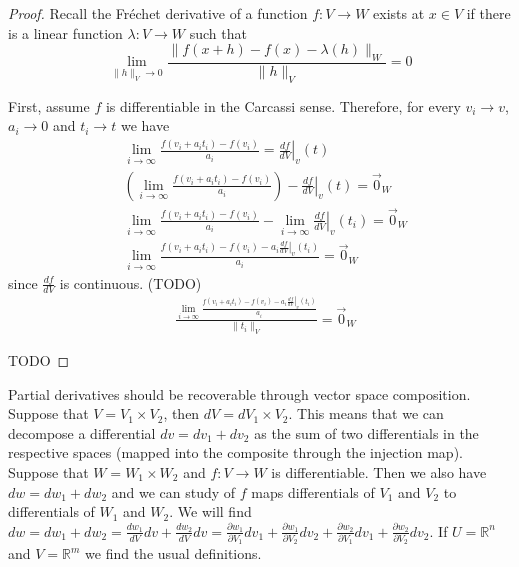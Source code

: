 \documentclass[11pt,letterpaper,fleqn]{memoir}
\begin{document}
\begin{proof}
	Recall the Fr\'{e}chet derivative of a function $f: V \to W$ exists at $x \in V$ if there is a linear function $\lambda: V \to W$ such that
	\begin{equation}
	\lim_{\lVert h \rVert_{V} \to 0} \frac{\lVert f(x + h) - f(x) - \lambda(h) \rVert_{W}}{\lVert h \rVert_{V}} = 0 
	\end{equation}
	
	First, assume $f$ is differentiable in the Carcassi sense. Therefore, for every $v_i \to v$, $a_i \to 0$ and $t_i \to t$ we have
	\begin{equation}
		\begin{aligned}
	&\lim_{i \to \infty} \frac{f(v_{i} + a_{i}t_{i}) - f(v_{i})}{a_{i}} = \left.\frac{df}{dV}\right|_{v}(t) \\
	&\left( \lim_{i \to \infty} \frac{f(v_{i} + a_{i}t_{i}) - f(v_{i})}{a_{i}} \right) - \left.\frac{df}{dV}\right|_{v}(t) = \vec{0}_{W} \\
	&\lim_{i \to \infty} \frac{f(v_{i} + a_{i}t_{i}) - f(v_{i})}{a_{i}} - \lim_{i \to \infty}  \left.\frac{df}{dV}\right|_{v}(t_i) = \vec{0}_{W} \\
	&\lim_{i \to \infty} \frac{f(v_{i} + a_{i}t_{i}) - f(v_{i}) - a_{i}\left.\frac{df}{dV}\right|_{v}(t_i)}{a_{i}} = \vec{0}_{W}
		\end{aligned}
	\end{equation}
	since $\frac{df}{dV}$ is continuous. (TODO) 
	\begin{equation}
		\begin{aligned}
	&\frac{\lim_{i \to \infty} \frac{f(v_{i} + a_{i}t_{i}) - f(v_{i}) - a_{i}\left.\frac{df}{dV}\right|_{v}(t_i)}{a_{i}}}{\lVert t_i \rVert_{V}} = \vec{0}_{W}
		\end{aligned}
	\end{equation}

	TODO	
\end{proof}

\begin{remark}
	Partial derivatives should be recoverable through vector space composition. Suppose that $V = V_1 \times V_2$, then $dV = dV_1 \times V_2$. This means that we can decompose a differential $dv= dv_1 + dv_2$ as the sum of two differentials in the respective spaces (mapped into the composite through the injection map). Suppose that $W = W_1 \times W_2$ and $f : V \to W$ is differentiable. Then we also have $dw= dw_1 + dw_2$ and we can study of $f$ maps differentials of $V_1$ and $V_2$ to differentials of $W_1$ and $W_2$. We will find $dw = dw_1 + dw_2 = \frac{dw_1}{dV} dv + \frac{dw_2}{dV} dv = \frac{\partial w_1}{\partial V_1} dv_1 + \frac{\partial w_1}{\partial V_2} dv_2 + \frac{\partial w_2}{\partial V_1} dv_1 + \frac{\partial w_2}{\partial V_2} dv_2$. If $U = \mathbb{R}^n$ and $V = \mathbb{R}^m$ we find the usual definitions.
\end{remark}
\end{document}
